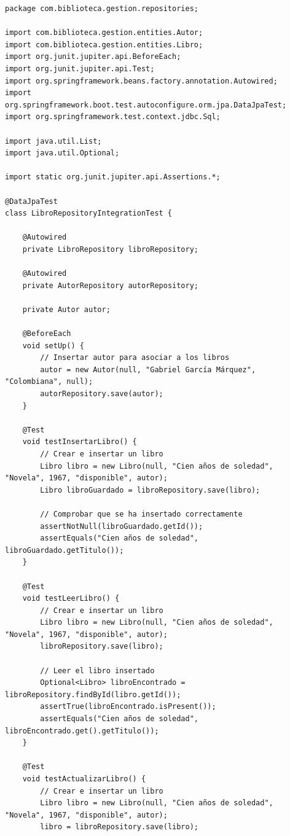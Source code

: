 \documentclass[11pt]{article}
\begin{document}
\begin{verbatim}
package com.biblioteca.gestion.repositories;

import com.biblioteca.gestion.entities.Autor;
import com.biblioteca.gestion.entities.Libro;
import org.junit.jupiter.api.BeforeEach;
import org.junit.jupiter.api.Test;
import org.springframework.beans.factory.annotation.Autowired;
import org.springframework.boot.test.autoconfigure.orm.jpa.DataJpaTest;
import org.springframework.test.context.jdbc.Sql;

import java.util.List;
import java.util.Optional;

import static org.junit.jupiter.api.Assertions.*;

@DataJpaTest
class LibroRepositoryIntegrationTest {

    @Autowired
    private LibroRepository libroRepository;

    @Autowired
    private AutorRepository autorRepository;

    private Autor autor;

    @BeforeEach
    void setUp() {
        // Insertar autor para asociar a los libros
        autor = new Autor(null, "Gabriel García Márquez", "Colombiana", null);
        autorRepository.save(autor);
    }

    @Test
    void testInsertarLibro() {
        // Crear e insertar un libro
        Libro libro = new Libro(null, "Cien años de soledad", "Novela", 1967, "disponible", autor);
        Libro libroGuardado = libroRepository.save(libro);

        // Comprobar que se ha insertado correctamente
        assertNotNull(libroGuardado.getId());
        assertEquals("Cien años de soledad", libroGuardado.getTitulo());
    }

    @Test
    void testLeerLibro() {
        // Crear e insertar un libro
        Libro libro = new Libro(null, "Cien años de soledad", "Novela", 1967, "disponible", autor);
        libroRepository.save(libro);

        // Leer el libro insertado
        Optional<Libro> libroEncontrado = libroRepository.findById(libro.getId());
        assertTrue(libroEncontrado.isPresent());
        assertEquals("Cien años de soledad", libroEncontrado.get().getTitulo());
    }

    @Test
    void testActualizarLibro() {
        // Crear e insertar un libro
        Libro libro = new Libro(null, "Cien años de soledad", "Novela", 1967, "disponible", autor);
        libro = libroRepository.save(libro);


\end{verbatim}
\end{document}

